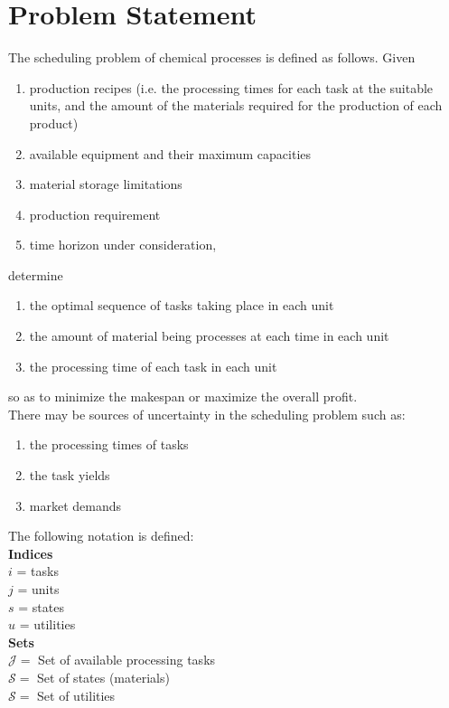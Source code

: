 \chapter{Problem Statement}
\thispagestyle{plain}

The scheduling problem of chemical processes is defined as follows. Given
\begin{enumerate}[label=\roman*.]
\item production recipes (i.e. the processing times for each task at the suitable units, and the amount of the materials required for the production of each product)
\item available equipment and their maximum capacities
\item material storage limitations
\item production requirement
\item time horizon under consideration,
\end{enumerate}
determine
\begin{enumerate}[label=\roman*.]
\item the optimal sequence of tasks taking place in each unit
\item the amount of material being processes at each time in each unit
\item the processing time of each task in each unit
\end{enumerate}
so as to minimize the makespan or maximize the overall profit. \\
There may be sources of uncertainty in the scheduling problem such as:
\begin{enumerate}[label=\roman*.]
\item the processing times of tasks
\item the task yields
\item market demands
\end{enumerate}
The following notation is defined: \\
\textbf{Indices} \\
$i$ = tasks \\
$j$ = units  \\
$s$ = states  \\
$u$ = utilities \\
\textbf{Sets} \\
$\mathcal{J} = $ Set of available processing tasks \\
$\mathcal{S} = $ Set of states (materials) \\
$\mathcal{S} = $ Set of utilities \\
